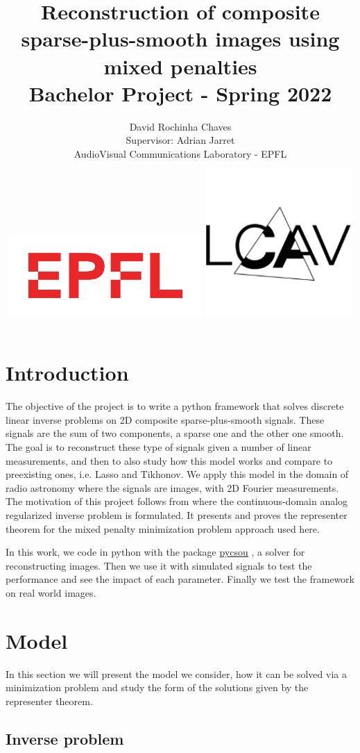 \documentclass[a4paper,11pt,oneside]{report}
\title{\textbf{Reconstruction of composite sparse-plus-smooth images using mixed penalties} \\[2ex] \large Bachelor Project - Spring 2022}
\author{David Rochinha Chaves\\{\small Supervisor: Adrian Jarret}\\[2cm]{AudioVisual Communications Laboratory - EPFL}}
\date{
\includegraphics[width=2.9in]{EPFLlogo}
\includegraphics[width=2.2in]{LABlogo}}
\theoremstyle{named}
\begin{document}
\maketitle
\tableofcontents

\chapter{Introduction}
The objective of the project is to write a python framework that solves discrete linear inverse problems on 2D composite sparse-plus-smooth signals. These signals are the sum of two components, a sparse one and the other one smooth. The goal is to reconstruct these type of signals given a number of linear measurements, and then to also study how this model works and compare to preexisting ones, i.e. Lasso and Tikhonov. We apply this model in the domain of radio astronomy where the signals are images, with 2D Fourier measurements. The motivation of this project follows from \cite{formulation} where the continuous-domain analog regularized inverse problem is formulated. It presents and proves the representer theorem for the mixed penalty minimization problem approach used here.

In this work, we code in python with the package \href{https://github.com/matthieumeo/pycsou}{pycsou} \cite{matthieu_simeoni_2021_4715243}, a solver for reconstructing images. Then we use it with simulated signals to test the performance and see the impact of each parameter. Finally we test the framework on real world images.


\chapter{Model}
In this section we will present the model we consider, how it can be solved via a minimization problem and study the form of the solutions given by the representer theorem.

\section{Inverse problem}
\end{document}
